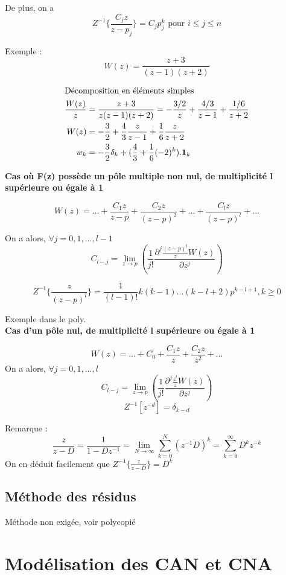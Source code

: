 \documentclass[main.tex]{subfiles}
\begin{document}
De plus, on a \[ \boxed{Z^{-1}\{\frac{C_jz}{z-p_j}\}=C_jp_j^k \text{ pour } i \leq j \leq n } \]

Exemple :
\[W(z) = \frac{z+3}{(z-1)(z+2)} \]

\begin{align*}
\intertext{Décomposition en éléments simples}
\frac{W(z)}{z} & = \frac{z+3}{z(z-1)(z+2)} = -\frac{3/2}{z}+\frac{4/3}{z-1}+\frac{1/6}{z+2} \\
W(z) & = -\frac{3}{2} + \frac{4}{3}\frac{z}{z-1} + \frac{1}{6}\frac{z}{z+2} \\
w_k & = -\frac{3}{2}\delta_k + (\frac{4}{3} + \frac{1}{6}(-2)^k).\mathbf{1}_k
\end{align*}

\noindent \textbf{Cas où F(z) possède un pôle multiple non nul, de multiplicité l supérieure ou égale à 1}

\[ W(z) = ... + \frac{C_1z}{z-p} + \frac{C_2z}{(z-p)^2} + ... + \frac{C_lz}{(z-p)^l} + ... \]

On a alors, $\forall j = 0,1,...,l-1$
\[ C_{l-j} = \lim_{z \rightarrow p} (\frac{1}{j!} \frac{\partial ^j \frac{(z-p)^l}{z}W(z)}{\partial z^j}) \]

\[Z^{-1}\{\frac{z}{(z-p)^l}\} = \frac{1}{(l-1)!}k(k-1)...(k-l+2)p^{k-l+1}, k\geq 0 \]

Exemple dans le poly.\\

\noindent \textbf{Cas d'un pôle nul, de multiplicité l supérieure ou égale à 1}

\[ W(z) = ... + C_0 + \frac{C_1z}{z} + \frac{C_2z}{z^2} + ... \]
On a alors, $\forall j = 0,1,...,l$
\[ C_{l-j} = \lim_{z \rightarrow p} (\frac{1}{j!} \frac{\partial ^j \frac{z^l}{z}W(z)}{\partial z^j}) \]
\[ Z^{-1} [z^{-d}] = \delta_{k-d} \]

Remarque :
\[ \frac{z}{z-D} = \frac{1}{1-Dz^{-1}} = \lim_{N\rightarrow\infty} \sum_{k=0}^N (z^{-1}D)^k = \sum_{k=0}^{\infty} D^k z^{-k} \]
On en déduit facilement que $Z^{-1}\{\frac{z}{z-D}\} = D^k$

\subsection{Méthode des résidus}
Méthode non exigée, voir polycopié

\section{Modélisation des CAN et CNA}
\end{document}
